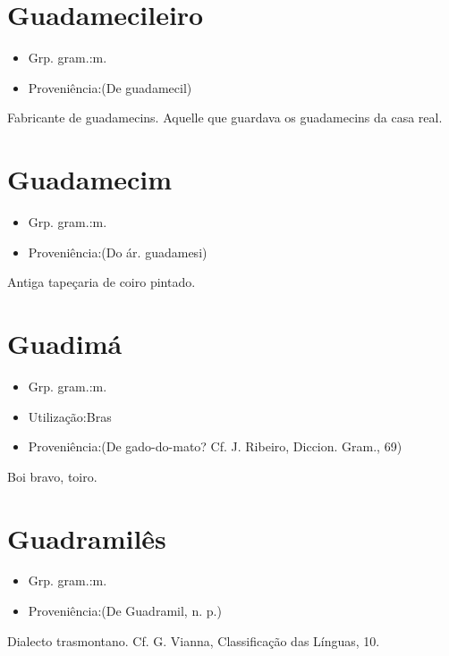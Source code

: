 \section{Guadamecileiro}
\begin{itemize}
\item {Grp. gram.:m.}
\end{itemize}
\begin{itemize}
\item {Proveniência:(De \textunderscore guadamecil\textunderscore )}
\end{itemize}
Fabricante de guadamecins.
Aquelle que guardava os guadamecins da casa real.
\section{Guadamecim}
\begin{itemize}
\item {Grp. gram.:m.}
\end{itemize}
\begin{itemize}
\item {Proveniência:(Do ár. \textunderscore guadamesi\textunderscore )}
\end{itemize}
Antiga tapeçaria de coiro pintado.
\section{Guadimá}
\begin{itemize}
\item {Grp. gram.:m.}
\end{itemize}
\begin{itemize}
\item {Utilização:Bras}
\end{itemize}
\begin{itemize}
\item {Proveniência:(De \textunderscore gado-do-mato\textunderscore ? Cf. J. Ribeiro, \textunderscore Diccion. Gram.\textunderscore , 69)}
\end{itemize}
Boi bravo, toiro.
\section{Guadramilês}
\begin{itemize}
\item {Grp. gram.:m.}
\end{itemize}
\begin{itemize}
\item {Proveniência:(De \textunderscore Guadramil\textunderscore , \textunderscore n. p.\textunderscore )}
\end{itemize}
Dialecto trasmontano. Cf. G. Vianna, \textunderscore Classificação das Línguas\textunderscore , 10.
